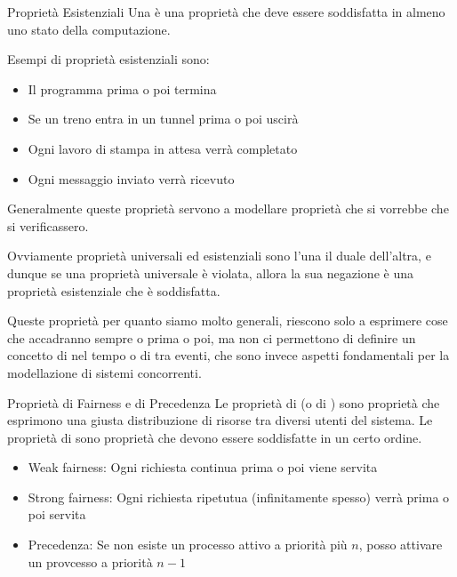 \begin{definition}{Proprietà Esistenziali}
  Una  è una proprietà che deve essere soddisfatta in almeno uno stato della computazione.
\end{definition}

\begin{example}{}
  Esempi di proprietà esistenziali sono:
  \begin{itemize}
    \item Il programma prima o poi termina
    \item Se un treno entra in un tunnel prima o poi uscirà
    \item Ogni lavoro di stampa in attesa verrà completato
    \item Ogni messaggio inviato verrà ricevuto
  \end{itemize}

  Generalmente queste proprietà servono a modellare proprietà che si vorrebbe che si verificassero.
\end{example}

Ovviamente proprietà universali ed esistenziali sono l'una il duale dell'altra, e dunque se una proprietà universale è violata, allora la sua negazione è una proprietà esistenziale che è soddisfatta.

Queste proprietà per quanto siamo molto generali, riescono solo a esprimere cose che accadranno sempre o prima o poi, ma non ci permettono di definire un concetto di  nel tempo o di  tra eventi, che sono invece aspetti fondamentali per la modellazione di sistemi concorrenti.

\begin{definition}{Proprietà di Fairness e di Precedenza}
  Le proprietà di  (o di ) sono proprietà che esprimono una giusta distribuzione di risorse tra diversi utenti del sistema.
  Le proprietà di  sono proprietà che devono essere soddisfatte in un certo ordine.
\end{definition}

\begin{example}{}
  \begin{itemize}
    \item Weak fairness: Ogni richiesta continua prima o poi viene servita
    \item Strong fairness: Ogni richiesta ripetutua (infinitamente spesso) verrà prima o poi servita
    \item Precedenza: Se non esiste un processo attivo a priorità più \(n\), posso attivare un provcesso a priorità \(n - 1\)
  \end{itemize}
\end{example}

